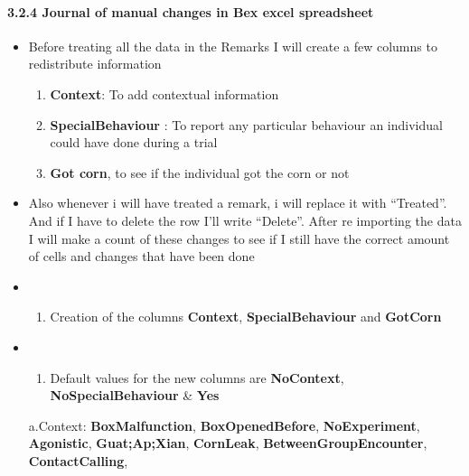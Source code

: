 \documentclass[
]{article}
\providecommand{\tightlist}{%
  \setlength{\itemsep}{0pt}\setlength{\parskip}{0pt}}
\begin{document}
\hypertarget{journal-of-manual-changes-in-bex-excel-spreadsheet}{%
\paragraph{3.2.4 Journal of manual changes in Bex excel
spreadsheet}\label{journal-of-manual-changes-in-bex-excel-spreadsheet}}

\begin{itemize}
\item
  Before treating all the data in the Remarks I will create a few
  columns to redistribute information

  \begin{enumerate}
  \def\labelenumi{\arabic{enumi}.}
  \tightlist
  \item
    \textbf{Context}: To add contextual information
  \item
    \textbf{SpecialBehaviour} : To report any particular behaviour an
    individual could have done during a trial
  \item
    \textbf{Got corn}, to see if the individual got the corn or not
  \end{enumerate}
\item
  Also whenever i will have treated a remark, i will replace it with
  ``Treated''. And if I have to delete the row I'll write ``Delete''.
  After re importing the data I will make a count of these changes to
  see if I still have the correct amount of cells and changes that have
  been done
\item
  \begin{enumerate}
  \def\labelenumi{\arabic{enumi}.}
  \tightlist
  \item
    Creation of the columns \textbf{Context}, \textbf{SpecialBehaviour}
    and \textbf{GotCorn}
  \end{enumerate}
\item
  \begin{enumerate}
  \def\labelenumi{\arabic{enumi}.}
  \setcounter{enumi}{1}
  \tightlist
  \item
    Default values for the new columns are \textbf{NoContext},
    \textbf{NoSpecialBehaviour} \& \textbf{Yes}
  \end{enumerate}

  a.Context: \textbf{BoxMalfunction}, \textbf{BoxOpenedBefore},
  \textbf{NoExperiment}, \textbf{Agonistic}, \textbf{Guat;Ap;Xian},
  \textbf{CornLeak}, \textbf{BetweenGroupEncounter},
  \textbf{ContactCalling},


\end{itemize}
\end{document}
